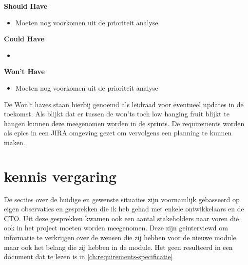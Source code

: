 \textbf{Should Have}
\begin{itemize}
  \item Moeten nog voorkomen uit de prioriteit analyse
\end{itemize}

\textbf{Could Have}
\begin{itemize}
\item
\end{itemize}

\textbf{Won't Have}
\begin{itemize}
  \item Moeten nog voorkomen uit de prioriteit analyse
\end{itemize}
De Won't haves staan hierbij genoemd als leidraad voor eventueel updates in de toekomst.
Als blijkt dat er tussen de won'ts toch low hanging fruit blijkt te hangen kunnen deze meegenomen worden in de sprints.
De requirements worden als epics in een JIRA omgeving gezet om vervolgens een planning te kunnen maken.



\section{kennis vergaring}
De secties over de huidige en gewenste situaties zijn voornamlijk gebasseerd op eigen observaties en gesprekken die ik heb gehad met enkele ontwikkelaars en de CTO. Uit deze gesprekken kwamen ook een aantal stakeholders naar voren die ook in het project moeten worden meegenomen. Deze zijn geinterviewd om informatie te verkrijgen over de wensen die zij hebben voor de nieuwe module maar ook het belang die zij hebben in de module. Het geen resulteerd in een document dat te lezen is in \ref{ch:requirements-specificatie}

